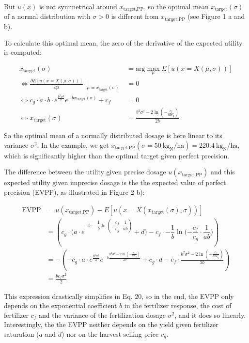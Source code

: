 But $u(x)$ is not symmetrical around $x_\text{target,PP}$, so the optimal mean $x_\text{target}(\sigma)$ of a normal distribution with $\sigma > 0$ is different from $x_\text{target,PP}$ (see Figure 1 a and b).

To calculate this optimal mean, the zero of the derivative of the expected utility is computed:

\begin{align}
    x_\text{target}(\sigma) &= \text{arg}\max_{\mu} E[u(x=X(\mu, \sigma))] \\
    \iff \frac{\partial E[u(x=X(\mu, \sigma))]}{\partial \mu} \mid_{ \mu = x_\text{target}(\sigma)} &= 0 \\
    \iff  c_g \cdot a \cdot b \cdot e^{\frac{b^2 \sigma^2}{2}} e^{-b x_\text{target}(\sigma)} + c_f &= 0 \\
    \iff x_\text{target}(\sigma) &= \frac{b^2 \sigma^2 - 2 \ln\left(-\frac{c_f}{a b c_g}\right)}{2 b}
\end{align}

So the optimal mean of a normally distributed dosage is here linear to its variance $\sigma^2$. In the example, we get $x_\text{target,PP}(\sigma = 50 \ \text{kg}_\text{N} / \text{ha}) = 220.4 \ \text{kg}_\text{N} / \text{ha}$, which is significantly higher than the optimal target given perfect precision.

The difference between the utility given precise dosage $u(x_\text{target,PP})$ and this expected utility given imprecise dosage is the the expected value of perfect precision (EVPP), as illustrated in Figure 2 b):

\begin{align}
    \text{EVPP} &= u(x_\text{target,PP}) - E[u(x=X(x_\text{target}(\sigma), \sigma))] \\
    &= \left(c_g \cdot \Biggl(a \cdot e^{-b \cdot -\dfrac{1}{b} \ln(-\dfrac{c_f}{c_g}\cdot\dfrac{1}{ab})} + d) - c_f
    \cdot -\dfrac{1}{b} \ln(-\dfrac{c_f}{c_g}\cdot\dfrac{1}{ab}\Biggr)\right) \\
    &= - \left(- c_g \cdot a \cdot e^{\frac{b^2 \sigma^2}{2}} e^{-b \frac{b^2 \sigma^2 - 2 \ln\left(-\frac{c_f}{a b
    c_g}\right)}{2 b}} + c_g \cdot d - c_f \cdot \frac{b^2 \sigma^2 - 2 \ln\left(-\frac{c_f}{a b c_g}\right)}{2 b}\right) \\
    &= \frac{b c_{f} \sigma^{2}}{2}
\end{align}

This expression drastically simplifies in Eq. 20, so in the end, the EVPP only depends on the exponential coefficient
$b$ in the fertilizer response, the cost of fertilizer $c_f$ and the variance of the fertilization dosage $\sigma^2$,
and it does so linearly. Interestingly, the the EVPP neither depends on the yield given fertilizer saturation ($a$ and $d$) nor on the harvest selling price $c_g$.
